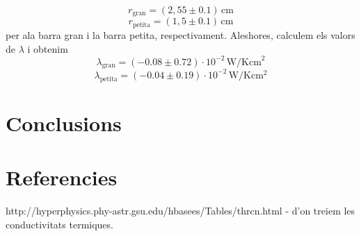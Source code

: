 \documentclass[12pt,twosides,onecolumn,openany]{article}
\begin{document}
\begin{multicols}{2}
\begin{equation*}
  r_{\text{gran}} = (2,55\pm0.1)\, \text{cm}
\end{equation*}
\begin{equation*}
  r_{\text{petita}} = (1,5\pm0.1)\, \text{cm}
\end{equation*}
per ala barra gran i la barra petita, respectivament. Aleshores, calculem els valors de $\lambda$ i obtenim
\begin{equation*}
  \lambda_{\text{gran}} = (-0.08\pm0.72)\cdot 10^{-2} \, \text{W}/\text{Kcm}^{2}
\end{equation*}
\begin{equation*}
  \lambda_{\text{petita}} = (-0.04\pm0.19)\cdot 10^{-2} \, \text{W}/\text{K}\text{cm}^{2}
\end{equation*}
\section{Conclusions}
\end{multicols}
\section{Referencies}
http://hyperphysics.phy-astr.gsu.edu/hbasees/Tables/thrcn.html - d'on treiem les conductivitats termiques.
\end{document}
